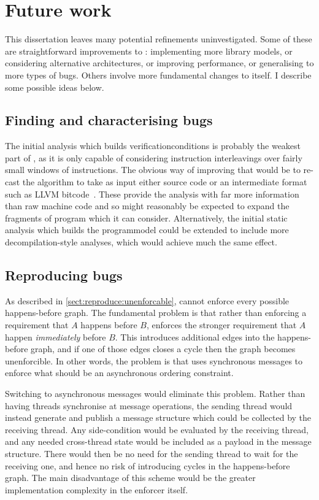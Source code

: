 \chapter{Future work}
\label{sect:fw}

This dissertation leaves many potential refinements uninvestigated.
Some of these are straightforward improvements to {\implementation}:
implementing more {\StateMachine} library models, or considering
alternative architectures, or improving performance, or generalising
to more types of bugs.  Others involve more fundamental changes to
{\technique} itself.  I describe some possible ideas below.

\section{Finding and characterising bugs}

The initial analysis which builds \glspl{verificationcondition} is
probably the weakest part of {\technique}, as it is only capable of
considering instruction interleavings over fairly small windows of
instructions.  The obvious way of improving that would be to re-cast
the algorithm to take as input either source code or an intermediate
format such as LLVM bitcode~\cite{FFFLattner2013}.  These provide the
analysis with far more information than raw machine code and so might
reasonably be expected to expand the fragments of program which it can
consider.  Alternatively, the initial static analysis which builds the
\gls{programmodel} could be extended to include more
decompilation-style analyses, which would achieve much the same
effect.

\section{Reproducing bugs}

As described in \autoref{sect:reproduce:unenforcable}, {\technique}
cannot enforce every possible happens-before graph.  The fundamental
problem is that rather than enforcing a requirement that $A$ happens
before $B$, {\technique} enforces the stronger requirement that $A$
happen \emph{immediately} before $B$.  This introduces additional edges
into the happens-before graph, and if one of those edges closes a
cycle then the graph becomes unenforcible.  In other words, the
problem is that {\technique} uses synchronous messages to enforce what
should be an asynchronous ordering constraint.

Switching to asynchronous messages would eliminate this problem.
Rather than having threads synchronise at message operations, the
sending thread would instead generate and publish a message structure
which could be collected by the receiving thread.  Any side-condition
would be evaluated by the receiving thread, and any needed
cross-thread state would be included as a payload in the message
structure.  There would then be no need for the sending thread to wait
for the receiving one, and hence no risk of introducing cycles in the
happens-before graph.  The main disadvantage of this scheme would be
the greater implementation complexity in the enforcer itself.


